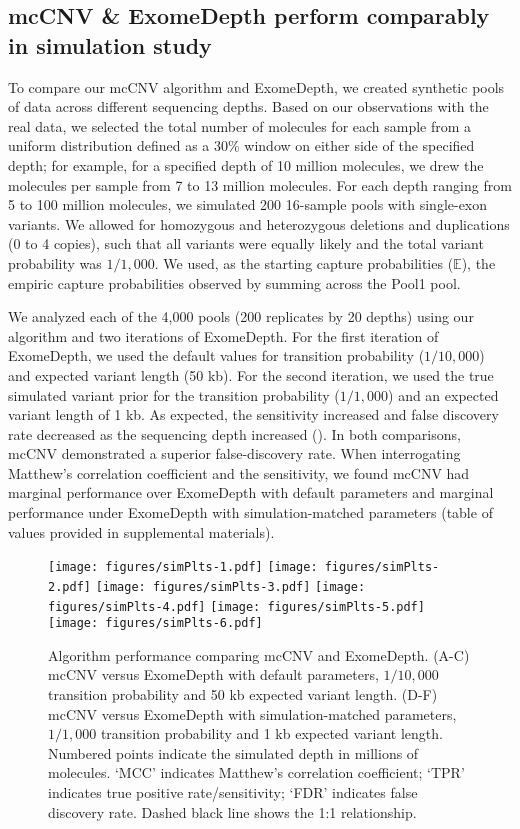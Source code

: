 \documentclass{article}\usepackage[]{graphicx}\usepackage[]{color}
\begin{document}
\subsection{mcCNV \& ExomeDepth perform comparably in simulation study}

To compare our mcCNV algorithm and ExomeDepth, we created synthetic pools of data across different sequencing depths.
Based on our observations with the real data, we selected the total number of molecules for each sample from a uniform distribution defined as a 30\% window on either side of the specified depth; for example, for a specified depth of 10 million molecules, we drew the molecules per sample from 7 to 13 million molecules.
For each depth ranging from 5 to 100 million molecules, we simulated 200 16-sample pools with single-exon variants.
We allowed for homozygous and heterozygous deletions and duplications (0 to 4 copies), such that all variants were equally likely and the total variant probability was $1/1,000$.
We used, as the starting capture probabilities ($\mathbb{E}$), the empiric capture probabilities observed by summing across the Pool1 pool.

We analyzed each of the 4,000 pools (200 replicates by 20 depths) using our algorithm and two iterations of ExomeDepth.
For the first iteration of ExomeDepth, we used the default values for transition probability ($1/10,000$) and expected variant length (50 kb).
For the second iteration, we used the true simulated variant prior for the transition probability ($1/1,000$) and an expected variant length of 1 kb.
As expected, the sensitivity increased and false discovery rate decreased as the sequencing depth increased ().
In both comparisons, mcCNV demonstrated a superior false-discovery rate.
When interrogating Matthew's correlation coefficient \cite{matthews:1975aa} and the sensitivity, we found mcCNV had marginal performance over ExomeDepth with default parameters and marginal performance under ExomeDepth with simulation-matched parameters (table of values provided in supplemental materials).

\begin{figure}
  \centering
  \texttt{[image: figures/simPlts-1.pdf]}%
  \texttt{[image: figures/simPlts-2.pdf]}%
  \texttt{[image: figures/simPlts-3.pdf]}
  \texttt{[image: figures/simPlts-4.pdf]}%
  \texttt{[image: figures/simPlts-5.pdf]}%
  \texttt{[image: figures/simPlts-6.pdf]}
  \caption{Algorithm performance comparing mcCNV and ExomeDepth. (A-C) mcCNV versus ExomeDepth with default parameters, $1/10,000$ transition probability and 50 kb expected variant length. (D-F) mcCNV versus ExomeDepth with simulation-matched parameters, $1/1,000$ transition probability and 1 kb expected variant length. Numbered points indicate the simulated depth in millions of molecules. `MCC' indicates Matthew's correlation coefficient; `TPR' indicates true positive rate/sensitivity; `FDR' indicates false discovery rate. Dashed black line shows the 1:1 relationship.}
  \label{fig:simRes}
\end{figure}
\end{document}
